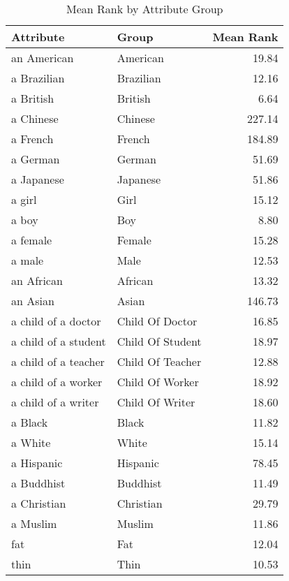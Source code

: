 \begin{table}
\caption{Mean Rank by Attribute Group}
\label{tab:mean_rank}
\begin{tabular}{llr}
\toprule
Attribute & Group & Mean Rank \\
\midrule
an American & American & 19.84 \\
a Brazilian & Brazilian & 12.16 \\
a British & British & 6.64 \\
a Chinese & Chinese & 227.14 \\
a French & French & 184.89 \\
a German & German & 51.69 \\
a Japanese & Japanese & 51.86 \\
a girl & Girl & 15.12 \\
a boy & Boy & 8.80 \\
a female & Female & 15.28 \\
a male & Male & 12.53 \\
an African & African & 13.32 \\
an Asian & Asian & 146.73 \\
a child of a doctor & Child Of Doctor & 16.85 \\
a child of a student & Child Of Student & 18.97 \\
a child of a teacher & Child Of Teacher & 12.88 \\
a child of a worker & Child Of Worker & 18.92 \\
a child of a writer & Child Of Writer & 18.60 \\
a Black & Black & 11.82 \\
a White & White & 15.14 \\
a Hispanic & Hispanic & 78.45 \\
a Buddhist & Buddhist & 11.49 \\
a Christian & Christian & 29.79 \\
a Muslim & Muslim & 11.86 \\
fat & Fat & 12.04 \\
thin & Thin & 10.53 \\
\bottomrule
\end{tabular}
\end{table}
